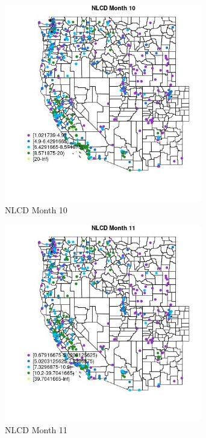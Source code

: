 \begin{figure} 
\centering  
\includegraphics[width=0.77\textwidth]{Code_Outputs/ML_input_report_ML_input_PM25_Step5_part_d_de_duplicated_aves_ML_input_MapObsMo10NLCD.jpg} 
\caption{\label{fig:ML_input_report_ML_input_PM25_Step5_part_d_de_duplicated_aves_ML_inputMapObsMo10NLCD}NLCD Month 10} 
\end{figure} 
 

\begin{figure} 
\centering  
\includegraphics[width=0.77\textwidth]{Code_Outputs/ML_input_report_ML_input_PM25_Step5_part_d_de_duplicated_aves_ML_input_MapObsMo11NLCD.jpg} 
\caption{\label{fig:ML_input_report_ML_input_PM25_Step5_part_d_de_duplicated_aves_ML_inputMapObsMo11NLCD}NLCD Month 11} 
\end{figure} 
 

